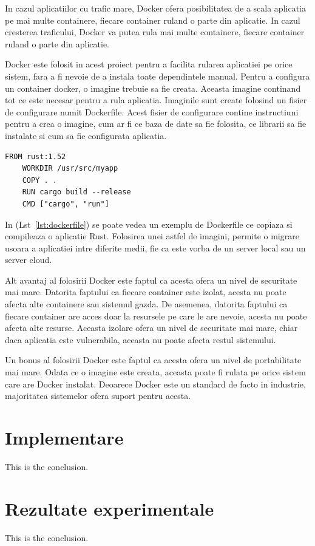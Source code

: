 \documentclass[titlepage,12pt]{article}
\begin{document}
In cazul aplicatiilor cu trafic mare, Docker ofera posibilitatea de a scala aplicatia pe mai multe containere, fiecare container ruland o parte din aplicatie.
In cazul cresterea traficului, Docker va putea rula mai multe containere, fiecare container ruland o parte din aplicatie.

Docker este folosit in acest proiect pentru a facilita rularea aplicatiei pe orice sistem, fara a fi nevoie de a instala toate dependintele manual.
Pentru a configura un container docker, o imagine trebuie sa fie creata.
Aceasta imagine continand tot ce este necesar pentru a rula aplicatia.
Imaginile sunt create folosind un fisier de configurare numit Dockerfile.
Acest fisier de configurare contine instructiuni pentru a crea o imagine, cum ar fi ce baza de date sa fie folosita, ce librarii sa fie instalate si cum sa fie configurata aplicatia.
\begin{lstlisting}[language=docker,caption={Exemplu Dockerfile},label={lst:dockerfile}]
    FROM rust:1.52
    WORKDIR /usr/src/myapp
    COPY . .
    RUN cargo build --release
    CMD ["cargo", "run"]
\end{lstlisting}
In (Lst~\ref{lst:dockerfile}) se poate vedea un exemplu de Dockerfile ce copiaza si compileaza o aplicatie Rust.
Folosirea unei astfel de imagini, permite o migrare usoara a aplicatiei intre diferite medii, fie ca este vorba de un server local sau un server cloud.

Alt avantaj al folosirii Docker este faptul ca acesta ofera un nivel de securitate mai mare.
Datorita faptului ca fiecare container este izolat, acesta nu poate afecta alte containere sau sistemul gazda.
De asemenea, datorita faptului ca fiecare container are acces doar la resursele pe care le are nevoie, acesta nu poate afecta alte resurse.
Aceasta izolare ofera un nivel de securitate mai mare, chiar daca aplicatia este vulnerabila, aceasta nu poate afecta restul sistemului.

Un bonus al folosirii Docker este faptul ca acesta ofera un nivel de portabilitate mai mare. Odata ce o imagine este creata, aceasta poate fi rulata pe orice sistem care are Docker instalat.
Deoarece Docker este un standard de facto in industrie, majoritatea sistemelor ofera suport pentru acesta.

\section{Implementare}
This is the conclusion.

\section{Rezultate experimentale}
This is the conclusion.
\end{document}
